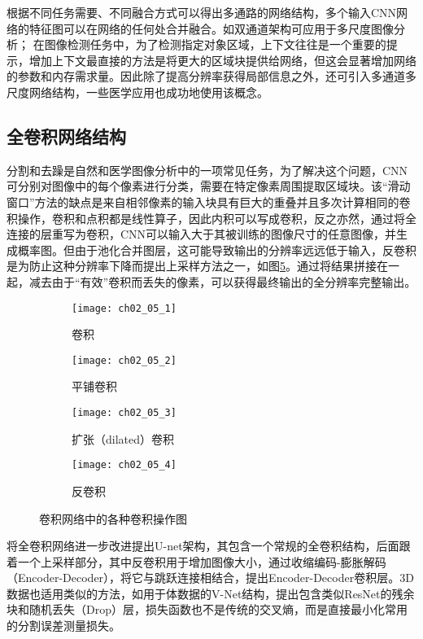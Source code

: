 根据不同任务需要、不同融合方式可以得出多通路的网络结构，多个输入CNN网络的特征图可以在网络的任何处合并融合。如双通道架构\cite{Kamnitsas2017}可应用于多尺度图像分析；
在图像检测任务中，为了检测指定对象区域，上下文往往是一个重要的提示，增加上下文最直接的方法是将更大的区域块提供给网络，但这会显著增加网络的参数和内存需求量。因此除了提高分辨率获得局部信息之外，还可引入多通道多尺度网络结构\cite{Farabet2013Learning}，一些医学应用也成功地使用该概念\citep{Kamnitsas2017,Moeskops2016Automatic,Song2015Accurate,Yang2016Cascade}。

\subsection{全卷积网络结构}
\label{sec:fully_arch}

分割和去躁是自然和医学图像分析中的一项常见任务，为了解决这个问题，CNN可分别对图像中的每个像素进行分类，需要在特定像素周围提取区域块。该“滑动窗口”方法的缺点是来自相邻像素的输入块具有巨大的重叠并且多次计算相同的卷积操作，卷积和点积都是线性算子，因此内积可以写成卷积，反之亦然，通过将全连接的层重写为卷积，CNN可以输入大于其被训练的图像尺寸的任意图像，并生成概率图。但由于池化合并图层，这可能导致输出的分辨率远远低于输入，反卷积\citep{Long2017Fully}是为防止这种分辨率下降而提出上采样方法之一，如图\ref{fig:ch02_05}。通过将结果拼接在一起，减去由于“有效”卷积而丢失的像素，可以获得最终输出的全分辨率完整输出。
\begin{figure}[!htbp]
    \centering
    \begin{subfigure}[b]{0.45\textwidth}
        \texttt{[image: ch02\_05\_1]}
        \caption{卷积}
        \label{fig:ch02_05_1}
    \end{subfigure}%
    \begin{subfigure}[b]{0.45\textwidth}
        \texttt{[image: ch02\_05\_2]}
        \caption{平铺卷积}
        \label{fig:ch02_05_02}
    \end{subfigure}
    \begin{subfigure}[b]{0.45\textwidth}
        \texttt{[image: ch02\_05\_3]}
        \caption{扩张（dilated）卷积}
        \label{fig:ch02_05_03}
    \end{subfigure}
    \begin{subfigure}[b]{0.45\textwidth}
        \texttt{[image: ch02\_05\_4]}
        \caption{反卷积}
        \label{fig:ch02_05_04}
    \end{subfigure}
    \caption{卷积网络中的各种卷积操作图}
    \label{fig:ch02_05}
\end{figure}
将全卷积网络进一步改进提出U-net架构\cite{Ronneberger2015}，其包含一个常规的全卷积结构，后面跟着一个上采样部分，其中反卷积用于增加图像大小，通过收缩编码-膨胀解码（Encoder-Decoder），将它与跳跃连接\citep{he15}相结合，提出Encoder-Decoder卷积层。3D数据也适用类似的方法，如用于体数据的V-Net结构，提出包含类似ResNet的残余块和随机丢失（Drop）层，损失函数也不是传统的交叉熵，而是直接最小化常用的分割误差测量损失\cite{Milletari2016}。

